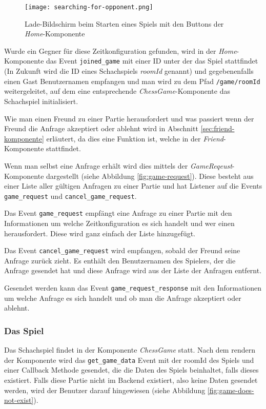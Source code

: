 \begin{figure}[h]
\centering
\texttt{[image: searching-for-opponent.png]}
\caption{Lade-Bildschirm beim Starten eines Spiels mit den Buttons der \textit{Home}-Komponente}
\label{fig:searching-for-opponent}
\end{figure}

Wurde ein Gegner für diese Zeitkonfiguration gefunden, wird in der \textit{Home}-Komponente das Event \verb|joined_game| mit einer ID unter der das Spiel stattfindet (In Zukunft wird die ID eines Schachspiels \textit{roomId} genannt) und gegebenenfalls einen Gast Benutzernamen empfangen und man wird zu dem Pfad \verb|/game/roomId| weitergeleitet, auf dem eine entsprechende \textit{ChessGame}-Komponente das Schachspiel initialisiert.

Wie man einen Freund zu einer Partie herausfordert und was passiert wenn der Freund die Anfrage akzeptiert oder ablehnt wird in Abschnitt \ref{sec:friend-komponente} erläutert, da dies eine Funktion ist, welche in der \textit{Friend}-Komponente stattfindet.

Wenn man selbst eine Anfrage erhält wird dies mittels der \textit{GameReqeust}-Komponente dargestellt (siehe Abbildung \ref{fig:game-request}). Diese besteht aus einer Liste aller gültigen Anfragen zu einer Partie und hat Listener auf die Events \verb|game_request| und \verb|cancel_game_request|. 

Das Event \verb|game_request| empfängt eine Anfrage zu einer Partie mit den Informationen um welche Zeitkonfiguration es sich handelt und wer einen herausfordert. Diese wird ganz einfach der Liste hinzugefügt. 

Das Event \verb|cancel_game_request| wird empfangen, sobald der Freund seine Anfrage zurück zieht. Es enthält den Benutzernamen des Spielers, der die Anfrage gesendet hat und diese Anfrage wird aus der Liste der Anfragen entfernt.

Gesendet werden kann das Event \verb|game_request_response| mit den Informationen um welche Anfrage es sich handelt und ob man die Anfrage akzeptiert oder ablehnt.
        \subsubsection{Das Spiel}
        \label{sec:Das-Schachspiel-Front}
Das Schachspiel findet in der Komponente \textit{ChessGame} statt.
Nach dem rendern der Komponente wird das \verb|get_game_data| Event mit der roomId des Spiels und einer Callback Methode gesendet, die die Daten des Spiels beinhaltet, falls dieses existiert. Falls diese Partie nicht im Backend existiert, also keine Daten gesendet werden, wird der Benutzer darauf hingewiesen (siehe Abbildung \ref{fig:game-does-not-exist}).

